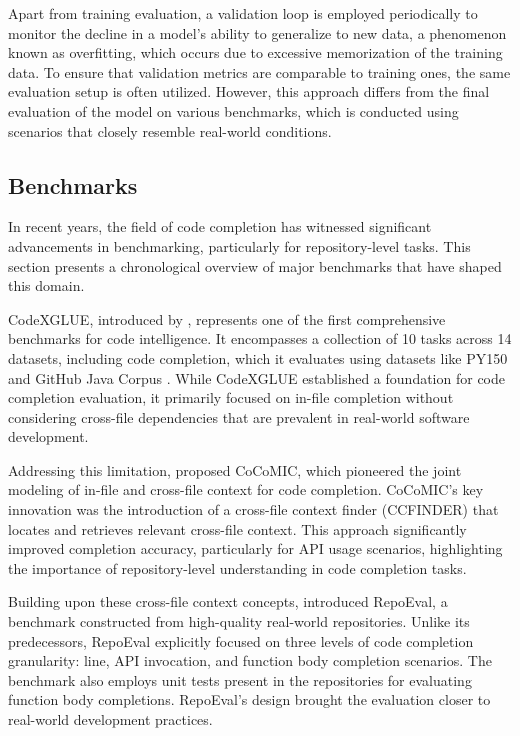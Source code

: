 Apart from training evaluation, a validation loop is employed periodically to monitor the decline in a model's ability to generalize to new data, a phenomenon known as overfitting, which occurs due to excessive memorization of the training data. To ensure that validation metrics are comparable to training ones, the same evaluation setup is often utilized. However, this approach differs from the final evaluation of the model on various benchmarks, which is conducted using scenarios that closely resemble real-world conditions.

\subsection{Benchmarks}\label{sec:benchmarks}

In recent years, the field of code completion has witnessed significant advancements in benchmarking, particularly for repository-level tasks. This section presents a chronological overview of major benchmarks that have shaped this domain.

CodeXGLUE, introduced by \citet{lu2021}, represents one of the first comprehensive benchmarks for code intelligence. It encompasses a collection of 10 tasks across 14 datasets, including code completion, which it evaluates using datasets like PY150 \parencite{raychev2016} and GitHub Java Corpus \parencite{allamanis2013}. While CodeXGLUE established a foundation for code completion evaluation, it primarily focused on in-file completion without considering cross-file dependencies that are prevalent in real-world software development.

Addressing this limitation, \citet{ding2022} proposed CoCoMIC, which pioneered the joint modeling of in-file and cross-file context for code completion. CoCoMIC's key innovation was the introduction of a cross-file context finder (CCFINDER) that locates and retrieves relevant cross-file context. This approach significantly improved completion accuracy, particularly for API usage scenarios, highlighting the importance of repository-level understanding in code completion tasks.

Building upon these cross-file context concepts, \citet{zhang2023} introduced RepoEval, a benchmark constructed from high-quality real-world repositories. Unlike its predecessors, RepoEval explicitly focused on three levels of code completion granularity: line, API invocation, and function body completion scenarios. The benchmark also employs unit tests present in the repositories for evaluating function body completions. RepoEval's design brought the evaluation closer to real-world development practices.

